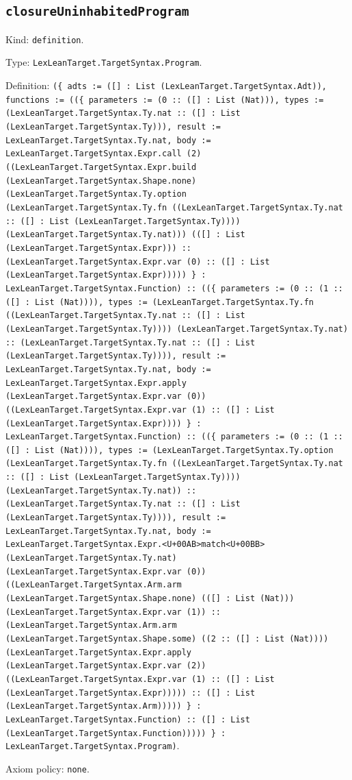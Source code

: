 \documentclass[11pt]{article}
\begin{document}
\subsection*{\texttt{closureUninhabitedProgram}}
\noindent Kind: \texttt{definition}.\par
\noindent Type: \texttt{LexLeanTarget.TargetSyntax.Program}.\par
\noindent Definition: \texttt{(\{ adts := ([] : List (LexLeanTarget.TargetSyntax.Adt)), functions := ((\{ parameters := (0 :: ([] : List (Nat))), types := (LexLeanTarget.TargetSyntax.Ty.nat :: ([] : List (LexLeanTarget.TargetSyntax.Ty))), result := LexLeanTarget.TargetSyntax.Ty.nat, body := LexLeanTarget.TargetSyntax.Expr.call (2) ((LexLeanTarget.TargetSyntax.Expr.build (LexLeanTarget.TargetSyntax.Shape.none) (LexLeanTarget.TargetSyntax.Ty.option (LexLeanTarget.TargetSyntax.Ty.fn ((LexLeanTarget.TargetSyntax.Ty.nat :: ([] : List (LexLeanTarget.TargetSyntax.Ty)))) (LexLeanTarget.TargetSyntax.Ty.nat))) (([] : List (LexLeanTarget.TargetSyntax.Expr))) :: (LexLeanTarget.TargetSyntax.Expr.var (0) :: ([] : List (LexLeanTarget.TargetSyntax.Expr))))) \} : LexLeanTarget.TargetSyntax.Function) :: ((\{ parameters := (0 :: (1 :: ([] : List (Nat)))), types := (LexLeanTarget.TargetSyntax.Ty.fn ((LexLeanTarget.TargetSyntax.Ty.nat :: ([] : List (LexLeanTarget.TargetSyntax.Ty)))) (LexLeanTarget.TargetSyntax.Ty.nat) :: (LexLeanTarget.TargetSyntax.Ty.nat :: ([] : List (LexLeanTarget.TargetSyntax.Ty)))), result := LexLeanTarget.TargetSyntax.Ty.nat, body := LexLeanTarget.TargetSyntax.Expr.apply (LexLeanTarget.TargetSyntax.Expr.var (0)) ((LexLeanTarget.TargetSyntax.Expr.var (1) :: ([] : List (LexLeanTarget.TargetSyntax.Expr)))) \} : LexLeanTarget.TargetSyntax.Function) :: ((\{ parameters := (0 :: (1 :: ([] : List (Nat)))), types := (LexLeanTarget.TargetSyntax.Ty.option (LexLeanTarget.TargetSyntax.Ty.fn ((LexLeanTarget.TargetSyntax.Ty.nat :: ([] : List (LexLeanTarget.TargetSyntax.Ty)))) (LexLeanTarget.TargetSyntax.Ty.nat)) :: (LexLeanTarget.TargetSyntax.Ty.nat :: ([] : List (LexLeanTarget.TargetSyntax.Ty)))), result := LexLeanTarget.TargetSyntax.Ty.nat, body := LexLeanTarget.TargetSyntax.Expr.<U+00AB>match<U+00BB> (LexLeanTarget.TargetSyntax.Ty.nat) (LexLeanTarget.TargetSyntax.Expr.var (0)) ((LexLeanTarget.TargetSyntax.Arm.arm (LexLeanTarget.TargetSyntax.Shape.none) (([] : List (Nat))) (LexLeanTarget.TargetSyntax.Expr.var (1)) :: (LexLeanTarget.TargetSyntax.Arm.arm (LexLeanTarget.TargetSyntax.Shape.some) ((2 :: ([] : List (Nat)))) (LexLeanTarget.TargetSyntax.Expr.apply (LexLeanTarget.TargetSyntax.Expr.var (2)) ((LexLeanTarget.TargetSyntax.Expr.var (1) :: ([] : List (LexLeanTarget.TargetSyntax.Expr))))) :: ([] : List (LexLeanTarget.TargetSyntax.Arm))))) \} : LexLeanTarget.TargetSyntax.Function) :: ([] : List (LexLeanTarget.TargetSyntax.Function))))) \} : LexLeanTarget.TargetSyntax.Program)}.\par
\noindent Axiom policy: \texttt{none}.\par
\end{document}
